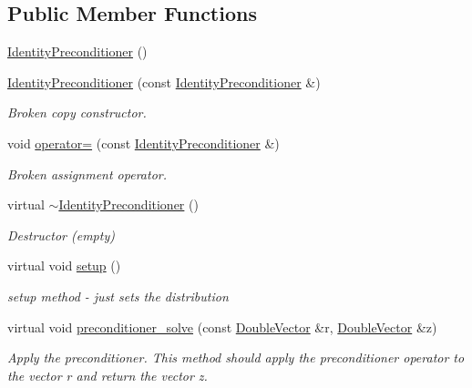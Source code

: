 \subsection*{Public Member Functions}
\begin{DoxyCompactItemize}
\item 
\hyperlink{classoomph_1_1IdentityPreconditioner_a5717f665ff04be550321d69bf2ecf58e}{Identity\+Preconditioner} ()
\item 
\hyperlink{classoomph_1_1IdentityPreconditioner_a95aeefc49b7cf4171566b4c5b0edb04a}{Identity\+Preconditioner} (const \hyperlink{classoomph_1_1IdentityPreconditioner}{Identity\+Preconditioner} \&)
\begin{DoxyCompactList}\small\item\em Broken copy constructor. \end{DoxyCompactList}\item 
void \hyperlink{classoomph_1_1IdentityPreconditioner_a1a87e0d6233505b9f7d114c7d666ef11}{operator=} (const \hyperlink{classoomph_1_1IdentityPreconditioner}{Identity\+Preconditioner} \&)
\begin{DoxyCompactList}\small\item\em Broken assignment operator. \end{DoxyCompactList}\item 
virtual \hyperlink{classoomph_1_1IdentityPreconditioner_a3e24cbb18f15b0ee32856b69a04e00e8}{$\sim$\+Identity\+Preconditioner} ()
\begin{DoxyCompactList}\small\item\em Destructor (empty) \end{DoxyCompactList}\item 
virtual void \hyperlink{classoomph_1_1IdentityPreconditioner_a7a747d5499c2b04a9ecedcf97d41ede8}{setup} ()
\begin{DoxyCompactList}\small\item\em setup method -\/ just sets the distribution \end{DoxyCompactList}\item 
virtual void \hyperlink{classoomph_1_1IdentityPreconditioner_a8daf11465066158a258b5996984490af}{preconditioner\+\_\+solve} (const \hyperlink{classoomph_1_1DoubleVector}{Double\+Vector} \&r, \hyperlink{classoomph_1_1DoubleVector}{Double\+Vector} \&z)
\begin{DoxyCompactList}\small\item\em Apply the preconditioner. This method should apply the preconditioner operator to the vector r and return the vector z. \end{DoxyCompactList}\end{DoxyCompactItemize}
